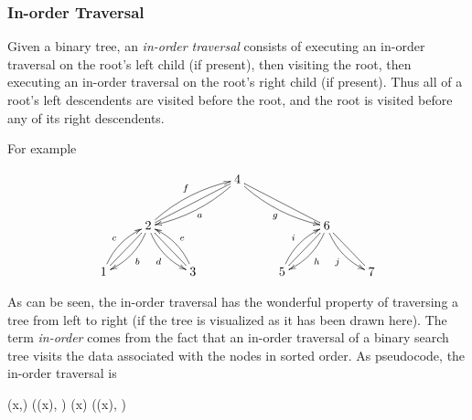 \documentclass[12pt]{article}
\begin{document}
\subsubsection*{In-order Traversal}

Given a binary tree, an \emph{in-order traversal} consists of executing an in-order traversal on the root's left child (if present), then visiting the root, then executing an in-order traversal on the root's right child (if present).
Thus all of a root's left descendents are visited before the root, and the root is visited before any of its right descendents.

For example

\[
\xymatrix{
&&&4 \ar@/^/[dll]^a \ar@/_/[drr]_g \ar@{-}[dll] \ar@{-}[drr] \\
&2 \ar@/^/[dl]^b \ar@/_/[dr]_d \ar@/^/[urr]^f \ar@{-}[dl] \ar@{-}[dr]&&&& 6 \ar@/^/[dl]^h \ar@/_/[dr]_j \ar@{-}[dl] \ar@{-}[dr] \\
1 \ar@/^/[ur]^c && 3 \ar@/_/[ul]_e && 5 \ar@/^/[ur]^i && 7
}
\]

  As can be seen, the in-order traversal has the wonderful property of traversing a tree from left to right (if the tree is visualized as it has been drawn here).
The term \emph{in-order} comes from the fact that an in-order traversal of a binary search tree visits the data associated with the nodes in sorted order.
As pseudocode, the in-order traversal is

\begin{program}
(x,)
((x), )
(x)
((x), )
\end{program}
\end{document}
